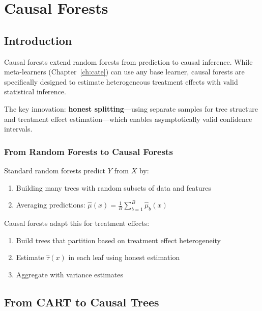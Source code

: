 \chapter{Causal Forests}
\label{ch:forests}


\section{Introduction}
\label{sec:forest_intro}

Causal forests extend random forests from prediction to causal inference. While meta-learners (Chapter~\ref{ch:cate}) can use any base learner, causal forests are specifically designed to estimate heterogeneous treatment effects with valid statistical inference.

The key innovation: \textbf{honest splitting}---using separate samples for tree structure and treatment effect estimation---which enables asymptotically valid confidence intervals.

\subsection{From Random Forests to Causal Forests}

Standard random forests predict $Y$ from $X$ by:
\begin{enumerate}
    \item Building many trees with random subsets of data and features
    \item Averaging predictions: $\hat{\mu}(x) = \frac{1}{B}\sum_{b=1}^{B} \hat{\mu}_b(x)$
\end{enumerate}

Causal forests adapt this for treatment effects:
\begin{enumerate}
    \item Build trees that partition based on treatment effect heterogeneity
    \item Estimate $\hat{\tau}(x)$ in each leaf using honest estimation
    \item Aggregate with variance estimates
\end{enumerate}

\section{From CART to Causal Trees}
\label{sec:causal_trees}

